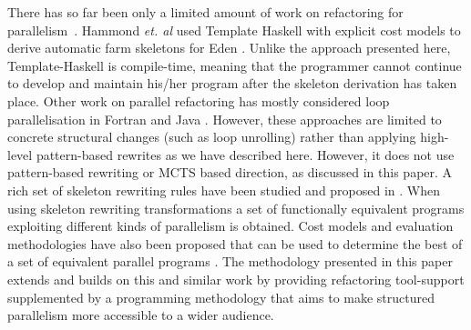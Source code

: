 \documentclass[smallextended]{svjour3}
\begin{document}
There has so far been only a limited amount of work on refactoring for parallelism~\cite{fmcoover}. 
Hammond \emph{et. al} \cite{HammKBertJL2003:PPL} used Template
Haskell \cite{Sheard:2002} with explicit cost models to derive automatic farm skeletons for Eden
\cite{Breitinger96eden}. Unlike the approach presented
here, Template-Haskell is compile-time, meaning that the programmer
cannot continue to develop and maintain his/her program after the
skeleton derivation has taken place. Other work on parallel refactoring
has mostly considered loop parallelisation in Fortran \cite{reentrancy} and
Java \cite{dig}. However, these approaches are limited to concrete
structural changes (such as loop unrolling) rather than applying
high-level pattern-based rewrites as we have described here. 
However, it does not use pattern-based rewriting or MCTS based direction, as discussed in this
paper. 
A rich set of skeleton rewriting rules have been studied and proposed in \cite{FAN:PPA:01,pdcs:nf:99,Gorlatch:99,SkillicornC95}.
When using skeleton rewriting transformations a set of functionally equivalent programs 
exploiting different kinds of parallelism is obtained. Cost models and evaluation
methodologies have also been proposed that can be used to determine the best of a set of 
equivalent parallel programs \cite{aldinuc:stream-data:98,SkillicornC95}. 
The methodology presented in this paper extends and builds on this
and similar work by providing refactoring tool-support
supplemented by a programming methodology that
aims to make structured parallelism more accessible to a wider audience.
\end{document}
